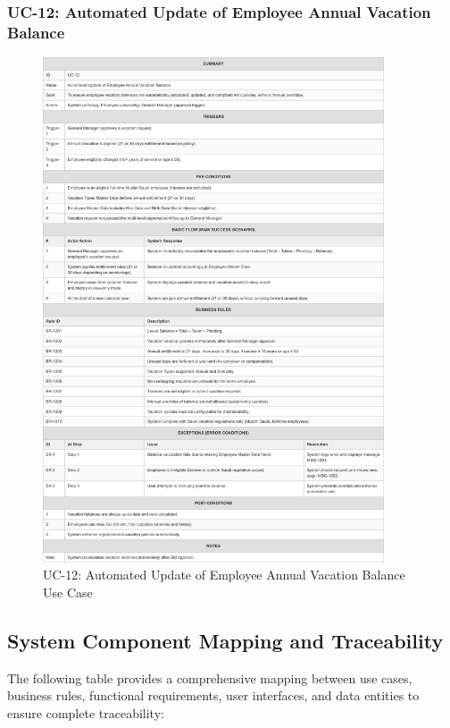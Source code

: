 \documentclass[12pt,a4paper]{article}
\begin{document}
\subsubsection{UC-12: Automated Update of Employee Annual Vacation Balance}
\begin{figure}[H]
\centering
\includegraphics[width=0.9\textwidth]{Use-Cases/UC-12-Automated-Update-of-Employee-Annual-Vacation-Balance/UC-12-Automated-Update-of-Employee-Annual-Vacation-Balance-1.png}
\caption{UC-12: Automated Update of Employee Annual Vacation Balance Use Case}
\label{fig:uc12}
\end{figure}

\subsection{System Component Mapping and Traceability}
The following table provides a comprehensive mapping between use cases, business rules, functional requirements, user interfaces, and data entities to ensure complete traceability:
\end{document}
